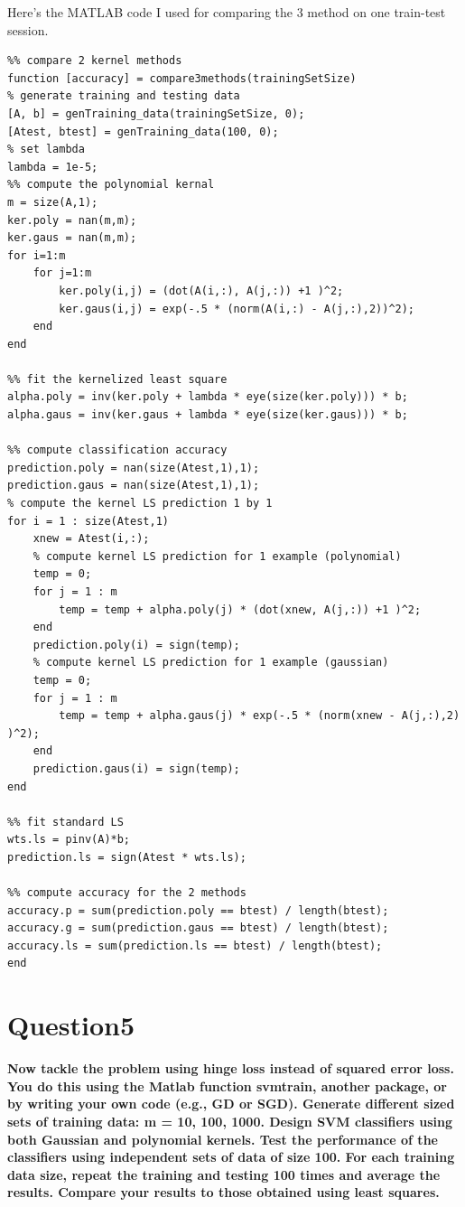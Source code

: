 \documentclass[paper=a4, fontsize=11pt]{scrartcl} %
\numberwithin{equation}{section} %
\numberwithin{figure}{section} %
\numberwithin{table}{section} %
\begin{document}
\newpage
Here's the MATLAB code I used for comparing the 3 method on one train-test session. 
\begin{lstlisting}
%% compare 2 kernel methods 
function [accuracy] = compare3methods(trainingSetSize)
% generate training and testing data
[A, b] = genTraining_data(trainingSetSize, 0);
[Atest, btest] = genTraining_data(100, 0);
% set lambda
lambda = 1e-5;
%% compute the polynomial kernal
m = size(A,1);
ker.poly = nan(m,m);
ker.gaus = nan(m,m);
for i=1:m
    for j=1:m
        ker.poly(i,j) = (dot(A(i,:), A(j,:)) +1 )^2;
        ker.gaus(i,j) = exp(-.5 * (norm(A(i,:) - A(j,:),2))^2);
    end
end

%% fit the kernelized least square
alpha.poly = inv(ker.poly + lambda * eye(size(ker.poly))) * b;
alpha.gaus = inv(ker.gaus + lambda * eye(size(ker.gaus))) * b;

%% compute classification accuracy
prediction.poly = nan(size(Atest,1),1);
prediction.gaus = nan(size(Atest,1),1);
% compute the kernel LS prediction 1 by 1
for i = 1 : size(Atest,1)
    xnew = Atest(i,:);
    % compute kernel LS prediction for 1 example (polynomial)
    temp = 0; 
    for j = 1 : m
        temp = temp + alpha.poly(j) * (dot(xnew, A(j,:)) +1 )^2;
    end
    prediction.poly(i) = sign(temp);    
    % compute kernel LS prediction for 1 example (gaussian)
    temp = 0;
    for j = 1 : m
        temp = temp + alpha.gaus(j) * exp(-.5 * (norm(xnew - A(j,:),2) )^2);
    end
    prediction.gaus(i) = sign(temp);    
end

%% fit standard LS
wts.ls = pinv(A)*b;
prediction.ls = sign(Atest * wts.ls);

%% compute accuracy for the 2 methods
accuracy.p = sum(prediction.poly == btest) / length(btest);
accuracy.g = sum(prediction.gaus == btest) / length(btest);
accuracy.ls = sum(prediction.ls == btest) / length(btest);
end

\end{lstlisting}




\newpage
\section*{Question5}
\textbf{Now tackle the problem using hinge loss instead of squared error loss. You do this using the Matlab function svmtrain, another package, or by writing your own code (e.g., GD or SGD). Generate different sized sets of training data: m = 10, 100, 1000. Design SVM classifiers using both Gaussian and polynomial kernels. Test the performance of the classifiers using independent sets of data of size 100. For each training data size, repeat the training and testing 100 times and average the results. Compare your results to those obtained using least squares.}\\
\end{document}
